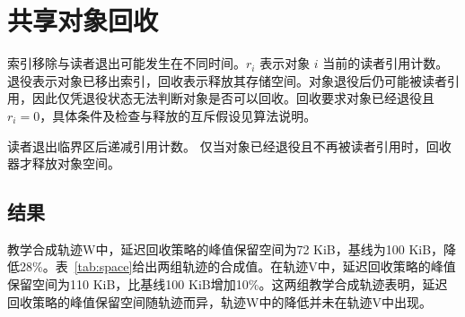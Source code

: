 \chapter{共享对象回收}
\label{ch:reclaim}
索引移除与读者退出可能发生在不同时间。$r_i$ 表示对象 $i$ 当前的读者引用计数。退役表示对象已移出索引，回收表示释放其存储空间。对象退役后仍可能被读者引用，因此仅凭退役状态无法判断对象是否可以回收。回收要求对象已经退役且 $r_i=0$，具体条件及检查与释放的互斥假设见算法说明。

读者退出临界区后递减引用计数。
仅当对象已经退役且不再被读者引用时，回收器才释放对象空间。
\section{结果}
教学合成轨迹W中，延迟回收策略的峰值保留空间为72 KiB，基线为100 KiB，降低28\%。表~\ref{tab:space}给出两组轨迹的合成值。在轨迹V中，延迟回收策略的峰值保留空间为110 KiB，比基线100 KiB增加10\%。这两组教学合成轨迹表明，延迟回收策略的峰值保留空间随轨迹而异，轨迹W中的降低并未在轨迹V中出现。

